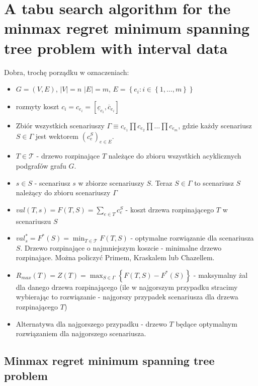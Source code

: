 \chapter{A tabu search algorithm for the minmax regret minimum spanning tree problem with interval data}
\thispagestyle{chapterBeginStyle}

Dobra, trochę porządku w oznaczeniach:

\begin{itemize}
	\item $G = \left( V, E \right)$, $\left| V \right| = n$ $\left| E \right| = m$, $E = \left\{ e_{i} : i \in \left\{ 1, \dots, m \right\} \right\}$
	\item rozmyty koszt $c_{i} = c_{e_{i}} = \left[ \underline{c}_{e_{i}}, \overline{c}_{e_{i}} \right]$
	\item Zbiór wszystkich scenariuszy $\Gamma \equiv c_{e_{1}} \prod c_{e_{2}} \prod \dots \prod c_{e_{m}}$, gdzie każdy scenariusz $S \in \Gamma$ jest wektorem $\left( c_{e}^{S} \right)_{e \in E}$.
	\item $T \in \mathcal{T}$ - drzewo rozpinające $T$ należące do zbioru wszystkich acyklicznych podgrafów grafu $G$.
	\item $s \in S$ - scenariusz $s$ w zbiorze scenariuszy $S$. Teraz $S \in \Gamma$ to scenariusz $S$ należący do zbioru scenariuszy $\Gamma$
	\item $val \left( T, s \right) = F \left( T, S \right) = \sum_{e \in T} c_{e}^{S}$ - koszt drzewa rozpinającego $T$ w scenariuszu $S$
	\item $val^{\ast}_{s} = F^{\ast} \left( S \right) = \min_{T \in \mathcal{T}} F \left( T, S \right)$ - optymalne rozwiązanie dla scenariusza $S$. Drzewo rozpinające o najmniejszym koszcie - minimalne drzewo rozpinające. Można policzyć Primem, Kraskalem lub Chazellem.
	\item $R_{max} \left( T \right) = Z \left( T \right) = \max_{S \in \Gamma} \left\{ F \left( T, S \right) - F^{\ast} \left( S \right) \right\}$ - maksymalny żal dla danego drzewa rozpinającego (ile w najgorszym przypadku stracimy wybierając to rozwiązanie - najgorszy przypadek scenariusza dla drzewa rozpinającego $T$)
	\item Alternatywa dla najgorszego przypadku - drzewo $T$ będące optymalnym rozwiązaniem dla najgorszego scenariusza.
\end{itemize}


\section{Minmax regret minimum spanning tree problem}

